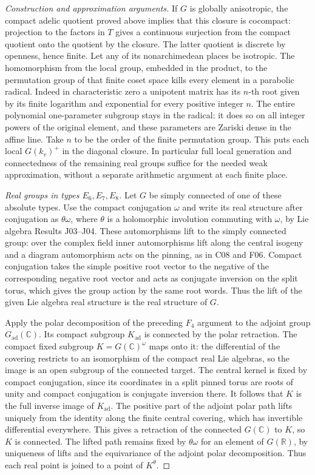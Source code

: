 \documentclass[11pt,a4paper,openany,oneside]{book}
\theoremstyle{resultstyle}
\theoremstyle{definition}
\numberwithin{equation}{chapter}
\begin{document}
\begin{proof}[Construction and approximation arguments]
If \(G\) is globally anisotropic, the compact adelic quotient
proved above implies that this closure is cocompact:
projection to the factors in \(T\) gives a continuous
surjection from the compact quotient onto the quotient by
the closure. The latter quotient is discrete by openness,
hence finite. Let any of its nonarchimedean places be
isotropic. The homomorphism from the local group, embedded
in the product, to the permutation group of that finite
coset space kills every element in a parabolic radical.
Indeed in characteristic zero a unipotent matrix has its
\(n\)-th root given by its finite logarithm and exponential
for every positive integer \(n\). The entire polynomial
one-parameter subgroup stays in the radical: it does so on
all integer powers of the original element, and these
parameters are Zariski dense in the affine line. Take \(n\)
to be the order of the finite permutation group. This
puts each local \(G(k_v)^+\) in the diagonal closure.
In particular full local generation and connectedness of
the remaining real groups suffice for the needed weak
approximation, without a separate arithmetic argument at
each finite place.

\medskip\noindent
\textit{Real groups in types \(E_6,E_7,E_8\).}
Let \(G\) be simply connected of one of these absolute types.
Use the compact conjugation \(\omega\) and write its real structure
after conjugation as \(\theta\omega\), where \(\theta\) is a holomorphic
involution commuting with \(\omega\), by Lie algebra Results J03--J04.
These automorphisms lift to the simply connected group: over the
complex field inner automorphisms lift along the central isogeny
and a diagram automorphism acts on the pinning, as in C08 and F06.
Compact conjugation takes the simple positive root vector to
the negative of the corresponding negative root vector and acts
as conjugate inversion on the split torus, which gives the group
action by the same root words. Thus the lift of the given Lie
algebra real structure is the real structure of \(G\).

Apply the polar decomposition of the preceding \(F_4\) argument
to the adjoint group \(G_{\mathrm{ad}}(\mathbb C)\). Its compact
subgroup \(K_{\mathrm{ad}}\) is connected by the polar retraction.
The compact fixed subgroup \(K=G(\mathbb C)^\omega\) maps onto it:
the differential of the covering restricts to an isomorphism
of the compact real Lie algebras, so the image is an open
subgroup of the connected target. The central kernel is
fixed by compact conjugation, since its coordinates in a
split pinned torus are roots of unity and compact conjugation
is conjugate inversion there. It follows that \(K\) is the full
inverse image of \(K_{\mathrm{ad}}\). The positive part of the
adjoint polar path lifts uniquely from the identity along
the finite central covering, which has invertible differential
everywhere. This gives a retraction of the connected
\(G(\mathbb C)\) to \(K\), so \(K\) is connected. The lifted
path remains fixed by \(\theta\omega\) for an element of
\(G(\mathbb R)\), by uniqueness of lifts and the equivariance
of the adjoint polar decomposition. Thus each real point
is joined to a point of \(K^\theta\).


\end{proof}
\end{document}
